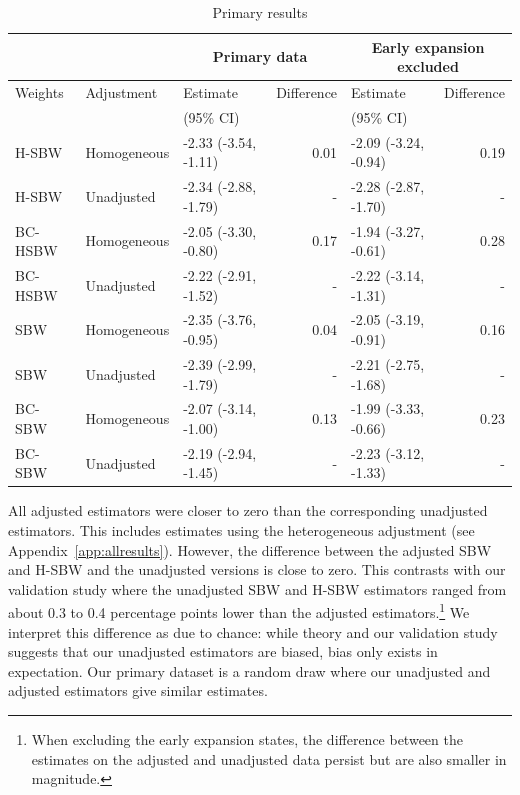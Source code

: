 \documentclass[aoas]{imsart}
\theoremstyle{plain}
\theoremstyle{remark}
\begin{document}
\begin{table}[ht]\caption{Primary results}\label{tab:mainresults}
\begin{tabular}{lllrlr} 
\hline
 &  & \multicolumn{2}{c}{Primary data} & \multicolumn{2}{c}{Early expansion 
 excluded} \\
  \hline
Weights & Adjustment & Estimate  & Difference & Estimate & Difference\\ 
 &  & (95\% CI) &  & (95\% CI) & \\
  \hline
H-SBW & Homogeneous & -2.33 (-3.54, -1.11) & 0.01 & -2.09 (-3.24, -0.94) & 0.19 \\ 
  H-SBW & Unadjusted & -2.34 (-2.88, -1.79) & - & -2.28 (-2.87, -1.70) & - \\ 
  BC-HSBW & Homogeneous & -2.05 (-3.30, -0.80) & 0.17 & -1.94 (-3.27, -0.61) & 0.28 \\ 
  BC-HSBW & Unadjusted & -2.22 (-2.91, -1.52) & - & -2.22 (-3.14, -1.31) & - \\ 
  SBW & Homogeneous & -2.35 (-3.76, -0.95) & 0.04 & -2.05 (-3.19, -0.91) & 0.16 \\ 
  SBW & Unadjusted & -2.39 (-2.99, -1.79) & - & -2.21 (-2.75, -1.68) & - \\ 
  BC-SBW & Homogeneous & -2.07 (-3.14, -1.00) & 0.13 & -1.99 (-3.33, -0.66) & 0.23 \\ 
  BC-SBW & Unadjusted & -2.19 (-2.94, -1.45) & - & -2.23 (-3.12, -1.33) & - \\    
  \hline
\end{tabular}
\end{table}

All adjusted estimators were closer to zero than the corresponding unadjusted estimators. This includes estimates using the heterogeneous adjustment (see Appendix~\ref{app:allresults}). However, the difference between the adjusted SBW and H-SBW and the unadjusted versions is close to zero. This contrasts with our validation study where the unadjusted SBW and H-SBW estimators ranged from about 0.3 to 0.4 percentage points lower than the adjusted estimators.\footnote{When excluding the early expansion states, the difference between the estimates on the adjusted and unadjusted data persist but are also smaller in magnitude.} We interpret this difference as due to chance: while theory and our validation study suggests that our unadjusted estimators are biased, bias only exists in expectation. Our primary dataset is a random draw where our unadjusted and adjusted estimators give similar estimates.
\end{document}
